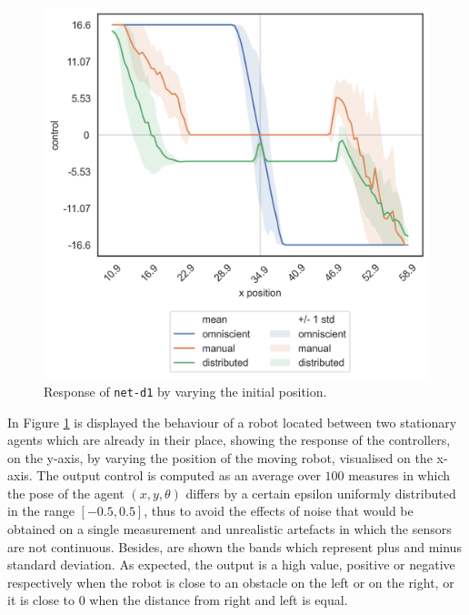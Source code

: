 \begin{figure}[!htb]
	\centering
	\includegraphics[width=.45\textwidth]{contents/images/net-d1/response-varying_init_position-distributed}%
	\caption{Response of \texttt{net-d1} by varying the initial position.}
	\label{fig:net-d1responseposition}
\end{figure}
In Figure \ref{fig:net-d1responseposition} is displayed the behaviour of a robot 
located between two stationary agents which are already in their place, showing 
the response of the controllers, on the y-axis, by varying the position of the 
moving robot, visualised on the x-axis. The output control is computed as an 
average over $100$ measures in which the pose of the agent $(x, y, \theta)$ 
differs by a certain epsilon uniformly distributed in the range $[-0.5, 0.5]$, thus 
to avoid the effects of noise that would be obtained on a single measurement and 
unrealistic artefacts in which the sensors are not continuous. Besides, are shown 
the bands which represent plus and minus standard deviation. As expected, the 
output is a high value, positive or negative respectively when the robot is close to 
an obstacle on the left or on the right, or it is close to $0$ when the distance from 
right and left is equal.
